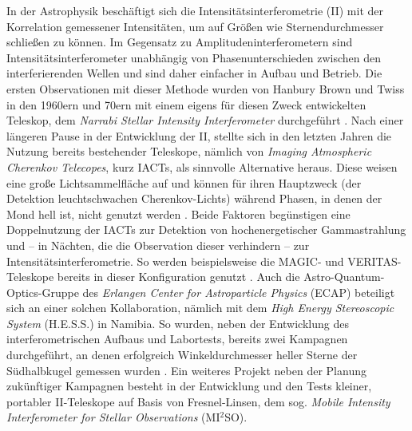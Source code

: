 In der Astrophysik beschäftigt sich die Intensitätsinterferometrie (II) mit der Korrelation gemessener Intensitäten, um auf Größen wie Sternendurchmesser schließen zu können. 
Im Gegensatz zu Amplitudeninterferometern sind Intensitätsinterferometer unabhängig von Phasenunterschieden zwischen den interferierenden Wellen und sind daher einfacher in Aufbau und Betrieb. 
Die ersten Observationen mit dieser Methode wurden von Hanbury Brown und Twiss in den 1960ern und 70ern mit einem eigens für diesen Zweck entwickelten Teleskop, dem \emph{Narrabi Stellar Intensity Interferometer} durchgeführt \cite{brownIntensityInterferometerIts1974}. 
Nach einer längeren Pause in der Entwicklung der II, stellte sich in den letzten Jahren die Nutzung bereits bestehender Teleskope, nämlich von \emph{Imaging Atmospheric Cherenkov Telecopes}, kurz IACTs, als sinnvolle Alternative heraus. 
Diese weisen eine große Lichtsammelfläche auf und können für ihren Hauptzweck (der Detektion leuchtschwachen Cherenkov-Lichts) während Phasen, in denen der Mond hell ist, nicht genutzt werden \cite{zmijaFirstIntensityInterferometry2023}. 
Beide Faktoren begünstigen eine Doppelnutzung der IACTs zur Detektion von hochenergetischer Gammastrahlung und -- in Nächten, die die Observation dieser verhindern -- zur Intensitätsinterferometrie. 
So werden beispielsweise die MAGIC- und VERITAS-Teleskope bereits in dieser Konfiguration genutzt \cite{acciariOpticalIntensityInterferometry2020,DemonstrationStellarIntensity}. 
Auch die Astro-Quantum-Optics-Gruppe des \emph{Erlangen Center for Astroparticle Physics} (ECAP) beteiligt sich an einer solchen Kollaboration, nämlich mit dem \emph{High Energy Stereoscopic System} (H.E.S.S.) in Namibia. 
So wurden, neben der Entwicklung des interferometrischen Aufbaus und Labortests, bereits zwei Kampagnen durchgeführt, an denen erfolgreich Winkeldurchmesser heller Sterne der Südhalbkugel gemessen wurden \cite{zmijaOpticalIntensityInterferometry2021,zmijaFirstIntensityInterferometry2023}. 
Ein weiteres Projekt neben der Planung zukünftiger Kampagnen besteht in der Entwicklung und den Tests kleiner, portabler II-Teleskope auf Basis von Fresnel-Linsen, dem sog. \emph{Mobile Intensity Interferometer for Stellar Observations} (MI$^2$SO). \\

